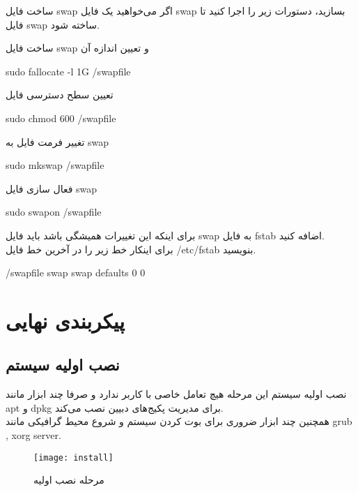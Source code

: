 \begin{frame}{ساخت فایل swap}
  اگر می‌خواهید یک فایل swap بسازید،‌ دستورات زیر را اجرا کنید تا فایل swap ساخته شود.
  \begin{alertblock}{ساخت فایل swap و تعیین اندازه آن}
    \begin{LTR}
    sudo fallocate -l 1G /swapfile
    \end{LTR}
  \end{alertblock}
  \begin{alertblock}{تعیین سطح دسترسی فایل}
    \begin{LTR}
    sudo chmod 600 /swapfile
    \end{LTR}
  \end{alertblock}
  \begin{alertblock}{تغییر فرمت فایل به swap}
    \begin{LTR}
    sudo mkswap /swapfile
    \end{LTR}
  \end{alertblock}
  \begin{alertblock}{فعال سازی فایل swap}
    \begin{LTR}
    sudo swapon /swapfile
    \end{LTR}
  \end{alertblock}  
  برای اینکه این تغییرات همیشگی باشد باید فایل swap به فایل fstab اضافه کنید.\\
  برای اینکار خط زیر را در آخرین خط فایل /etc/fstab بنویسید.
  \begin{LTR}
    /swapfile swap swap defaults 0 0
  \end{LTR}
\end{frame}
\section{پیکربندی نهایی}
\subsection{نصب اولیه سیستم}
\begin{frame}{نصب اولیه سیستم}
  این مرحله هیچ تعامل خاصی با کاربر ندارد و صرفا چند ابزار مانند apt و dpkg برای مدیریت پکیج‌های دبیین نصب می‌کند.\\
  همچنین چند ابزار ضروری برای بوت کردن سیستم و شروع محیط‌ گرافیکی مانند grub , xorg server.\\
  \begin{figure}
    \texttt{[image: install]}
    \caption{مرحله نصب اولیه~\cite{fig:deb_install}}
  \end{figure}
\end{frame}

